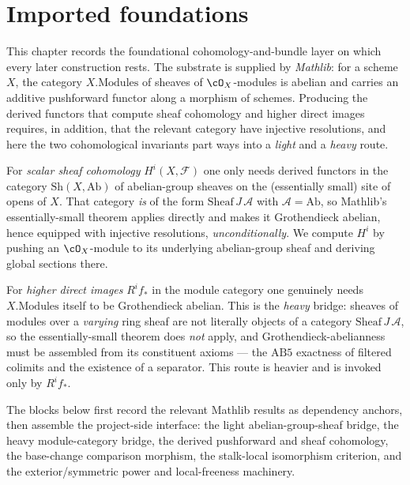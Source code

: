 \section{Imported foundations}


This chapter records the foundational cohomology-and-bundle layer on which every
later construction rests.  The substrate is supplied by \emph{Mathlib}: for a
scheme \(X\), the category \(X.\mathrm{Modules}\) of sheaves of
\(\cO_X\)-modules is abelian and carries an additive pushforward functor along a
morphism of schemes.  Producing the derived functors that compute sheaf
cohomology and higher direct images requires, in addition, that the relevant
category have injective resolutions, and here the two cohomological invariants
part ways into a \emph{light} and a \emph{heavy} route.

For \emph{scalar sheaf cohomology} \(H^i(X,\mathcal F)\) one only needs derived
functors in the category \(\mathrm{Sh}(X,\mathrm{Ab})\) of abelian-group sheaves
on the (essentially small) site of opens of \(X\).  That category \emph{is} of
the form \(\mathrm{Sheaf}\,J\,\mathcal A\) with \(\mathcal A=\mathrm{Ab}\), so
Mathlib's essentially-small theorem applies directly and makes it Grothendieck
abelian, hence equipped with injective resolutions, \emph{unconditionally}.  We
compute \(H^i\) by pushing an \(\cO_X\)-module to its underlying abelian-group
sheaf and deriving global sections there.

For \emph{higher direct images} \(R^if_*\) in the module category one genuinely
needs \(X.\mathrm{Modules}\) itself to be Grothendieck abelian.  This is the
\emph{heavy} bridge: sheaves of modules over a \emph{varying} ring sheaf are not
literally objects of a category \(\mathrm{Sheaf}\,J\,\mathcal A\), so the
essentially-small theorem does \emph{not} apply, and Grothendieck-abelianness
must be assembled from its constituent axioms --- the \(\mathrm{AB5}\) exactness
of filtered colimits and the existence of a separator.  This route is heavier
and is invoked only by \(R^if_*\).

The blocks below first record the relevant Mathlib results as dependency
anchors, then assemble the project-side interface: the light abelian-group-sheaf
bridge, the heavy module-category bridge, the derived pushforward and sheaf
cohomology, the base-change comparison morphism, the stalk-local isomorphism
criterion, and the exterior/symmetric power and local-freeness machinery.

